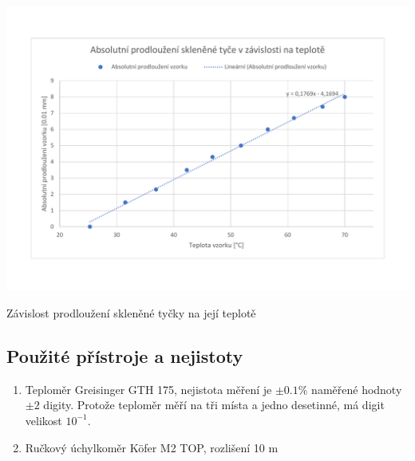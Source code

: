 \documentclass[a4paper,12pt]{article}   %
\begin{document}
  \begin{graph}[htbp]
    \centering
    \includegraphics[width=\textwidth]{graph-glass.pdf}
    \caption{Závislost prodloužení skleněné tyčky na její teplotě}
    \label{graph:sklo}
\end{graph}
\subsection{Použité přístroje a nejistoty}
\begin{enumerate}
  \label{pristroje}
  \item Teploměr Greisinger GTH 175, nejistota měření je $\pm 0.1\%$ naměřené hodnoty $\pm 2$ digity. Protože teploměr měří na tři místa a jedno desetinné, má digit velikost $10^{-1}$. \cite{url:thermometer}
  \item Ručkový úchylkoměr Köfer M2 TOP, rozlišení 10 \textmu m \cite{url:prezentace}
\end{enumerate}
\end{document}
